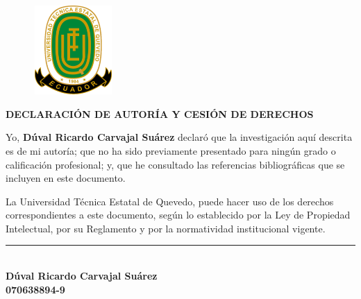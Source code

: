 \begin{center}
\begin{figure}[htb]
	\begin{center}
		\includegraphics[width=3.04cm,height=3.39cm]{img/logoUTEQ.png}
	\end{center}
\end{figure}

{\titulodc \textbf{DECLARACIÓN DE AUTORÍA Y CESIÓN DE DERECHOS}}

\end{center}
\vspace*{0.8in}
Yo, \textbf{Dúval Ricardo Carvajal Suárez} declaró que la investigación aquí descrita es de mi autoría; que no ha sido previamente presentado para ningún grado o calificación profesional; y, que he consultado las referencias bibliográficas que se incluyen en este documento.

 \sloppy
La Universidad Técnica Estatal de Quevedo, puede hacer uso de los derechos correspondientes a este documento, según lo establecido por la Ley de Propiedad Intelectual, por su Reglamento y por la normatividad institucional vigente. 

\begin{center}
	\vspace*{2in}
	\rule{8cm}{0.1mm} \\
	 \textbf{Dúval Ricardo Carvajal Suárez \\
	 070638894-9}
\end{center}
